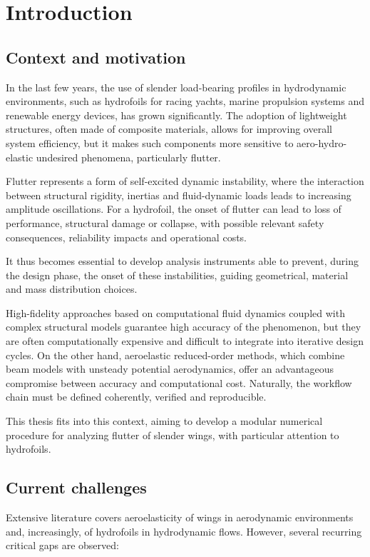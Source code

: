 \chapter{Introduction}
\section{Context and motivation}
In the last few years, the use of slender load-bearing profiles in hydrodynamic environments, such as hydrofoils for racing yachts,
marine propulsion systems and renewable energy devices, has grown significantly.
The adoption of lightweight structures, often made of composite materials, allows for improving overall system efficiency,
but it makes such components more sensitive to aero-hydro-elastic undesired phenomena, particularly flutter.

Flutter represents a form of self-excited dynamic instability, where the interaction between structural rigidity, 
inertias and fluid-dynamic loads leads to increasing amplitude oscillations.
For a hydrofoil, the onset of flutter can lead to loss of performance, structural damage or collapse, with possible
relevant safety consequences, reliability impacts and operational costs.

It thus becomes essential to develop analysis instruments able to prevent, during the design phase, the onset of these instabilities,
guiding geometrical, material and mass distribution choices.

High-fidelity approaches based on computational fluid dynamics coupled with complex structural models guarantee high accuracy of the phenomenon,
but they are often computationally expensive and difficult to integrate into iterative design cycles.
On the other hand, aeroelastic reduced-order methods, which combine beam models with unsteady potential aerodynamics,
offer an advantageous compromise between accuracy and computational cost. Naturally, the workflow chain must be defined coherently, verified and reproducible.

This thesis fits into this context, aiming to develop a modular numerical procedure for analyzing flutter of slender wings, 
with particular attention to hydrofoils.

\section{Current challenges}
Extensive literature covers aeroelasticity of wings in aerodynamic environments and, increasingly, of hydrofoils in hydrodynamic flows. 
However, several recurring critical gaps are observed:

